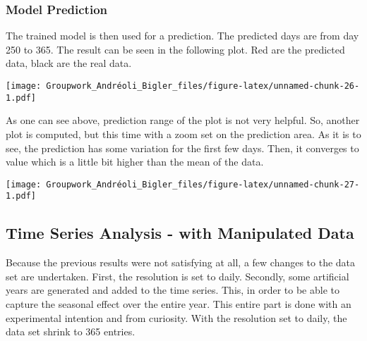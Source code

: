 \documentclass[
]{article}
\newenvironment{Shaded}{\begin{snugshade}}{\end{snugshade}}
\newcommand{\AttributeTok}[1]{\textcolor[rgb]{0.77,0.63,0.00}{#1}}
\newcommand{\DecValTok}[1]{\textcolor[rgb]{0.00,0.00,0.81}{#1}}
\newcommand{\FloatTok}[1]{\textcolor[rgb]{0.00,0.00,0.81}{#1}}
\newcommand{\FunctionTok}[1]{\textcolor[rgb]{0.00,0.00,0.00}{#1}}
\newcommand{\NormalTok}[1]{#1}
\newcommand{\OtherTok}[1]{\textcolor[rgb]{0.56,0.35,0.01}{#1}}
\newcommand{\SpecialCharTok}[1]{\textcolor[rgb]{0.00,0.00,0.00}{#1}}
\newcommand{\StringTok}[1]{\textcolor[rgb]{0.31,0.60,0.02}{#1}}
\begin{document}
\hypertarget{model-prediction}{%
\subsubsection{Model Prediction}\label{model-prediction}}

The trained model is then used for a prediction. The predicted days are
from day 250 to 365. The result can be seen in the following plot. Red
are the predicted data, black are the real data.

\texttt{[image: Groupwork\_Andréoli\_Bigler\_files/figure-latex/unnamed-chunk-26-1.pdf]}

As one can see above, prediction range of the plot is not very helpful.
So, another plot is computed, but this time with a zoom set on the
prediction area. As it is to see, the prediction has some variation for
the first few days. Then, it converges to value which is a little bit
higher than the mean of the data.

\begin{Shaded}
\end{Shaded}

\texttt{[image: Groupwork\_Andréoli\_Bigler\_files/figure-latex/unnamed-chunk-27-1.pdf]}

\hypertarget{time-series-analysis---with-manipulated-data}{%
\subsection{Time Series Analysis - with Manipulated
Data}\label{time-series-analysis---with-manipulated-data}}

Because the previous results were not satisfying at all, a few changes
to the data set are undertaken. First, the resolution is set to daily.
Secondly, some artificial years are generated and added to the time
series. This, in order to be able to capture the seasonal effect over
the entire year. This entire part is done with an experimental intention
and from curiosity. With the resolution set to daily, the data set
shrink to 365 entries.
\end{document}
